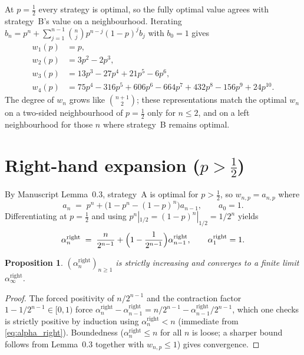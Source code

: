 \documentclass{article}
\newtheorem{proposition}{Proposition}
\theoremstyle{remark}
\begin{document}
At $p=\tfrac12$ every strategy is optimal, so the fully optimal value
agrees with strategy~B's value on a neighbourhood. Iterating
$b_{n}=p^{n}+\sum_{j=1}^{n-1}\binom{n}{j}p^{n-j}(1-p)^{j}b_{j}$ with
$b_{0}=1$ gives
\begin{align*}
  w_{1}(p) &= p,\\
  w_{2}(p) &= 3p^{2}-2p^{3},\\
  w_{3}(p) &= 13p^{3}-27p^{4}+21p^{5}-6p^{6},\\
  w_{4}(p) &= 75p^{4}-316p^{5}+606p^{6}-664p^{7}+432p^{8}-156p^{9}+24p^{10}.
\end{align*}
The degree of $w_n$ grows like $\binom{n+1}{2}$; these representations
match the optimal $w_{n}$ on a two-sided neighbourhood of $p=\tfrac12$
only for $n\le 2$, and on a left neighbourhood for those $n$ where
strategy~B remains optimal.

\section{Right-hand expansion ($p>\tfrac12$)}

By Manuscript Lemma~0.3, strategy~A is optimal for $p>\tfrac12$, so
$w_{n,p}=a_{n,p}$ where
\[
  a_{n}\;=\;p^{n}+\bigl(1-p^{n}-(1-p)^{n}\bigr)a_{n-1},\qquad a_{0}=1.
\]
Differentiating at $p=\tfrac12$ and using $p^{n}|_{1/2}=(1-p)^{n}|_{1/2}=1/2^{n}$ yields
\begin{equation}\label{eq:alpha_right}
  \alpha_{n}^{\text{right}}\;=\;\frac{n}{2^{n-1}}
  +\Bigl(1-\frac{1}{2^{n-1}}\Bigr)\alpha_{n-1}^{\text{right}},
  \qquad \alpha_{1}^{\text{right}}=1.
\end{equation}

\begin{proposition}
  $(\alpha_{n}^{\text{right}})_{n\ge1}$ is strictly increasing and
  converges to a finite limit $\alpha_{\infty}^{\text{right}}$.
\end{proposition}

\begin{proof}
  The forced positivity of $n/2^{n-1}$ and the contraction factor
  $1-1/2^{n-1}\in[0,1)$ force
  $\alpha_{n}^{\text{right}}-\alpha_{n-1}^{\text{right}}=
  n/2^{n-1}-\alpha_{n-1}^{\text{right}}/2^{n-1}$, which one checks is
  strictly positive by induction using
  $\alpha_{n}^{\text{right}}<n$ (immediate from \eqref{eq:alpha_right}).
  Boundedness ($\alpha_{n}^{\text{right}}\le n$ for all $n$ is loose;
  a sharper bound follows from Lemma~0.3 together with
  $w_{n,p}\le1$) gives convergence.
\end{proof}
\end{document}

